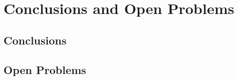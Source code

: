 \chapter{Conclusions and Open Problems}
\label{Chapter6}
\section{Conclusions}
\section{Open Problems}
